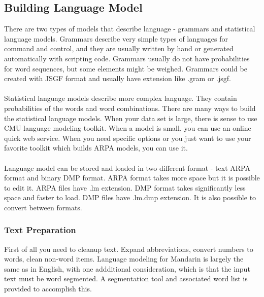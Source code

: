 \documentclass[12pt,a4paper,oneside]{memoir}
\begin{document}
\subsection{Building Language Model}


There are two types of models that describe language - grammars and statistical language models. Grammars describe very simple types of languages for command and control, and they are usually written by hand or generated automatically with scripting code. Grammars usually do not have probabilities for word sequences, but some elements might be weighed. Grammars could be created with JSGF format and usually have extension like .gram or .jsgf.\\\\
Statistical language models describe more complex language. They contain probabilities of the words and word combinations. There are many ways to build the statistical language models. When your data set is large, there is sense to use CMU language modeling toolkit. When a model is small, you can use an online quick web service. When you need specific options or you just want to use your favorite toolkit which builds ARPA models, you can use it.
\\\\
Language model can be stored and loaded in two different format - text ARPA format and binary DMP format. ARPA format takes more space but it is possible to edit it. ARPA files have .lm extension. DMP format takes significantly less space and faster to load. DMP files have .lm.dmp extension. It is also possible to convert between formats.

\subsubsection{Text Preparation}
First of all you need to cleanup text. Expand abbreviations, convert numbers to words, clean non-word items. Language modeling for Mandarin is largely the same as in English, with one addditional consideration, which is that the input text must be word segmented. A segmentation tool and associated word list is provided to accomplish this. 
\end{document}
